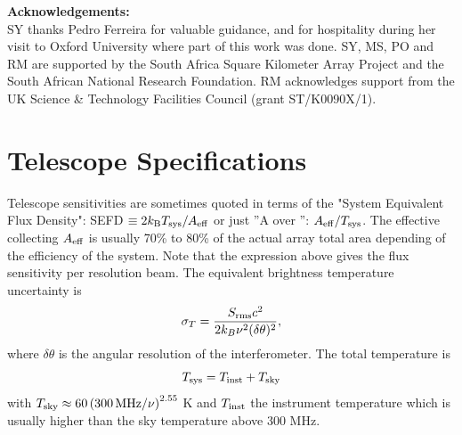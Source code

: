 \documentclass[useAMS,usenatbib]{mn2e}
\newcommand{\be}{\begin{equation}}
\newcommand{\ee}{\end{equation}}
\begin{document}
% 
%


\newpage
\[\]
{\bf Acknowledgements:}\\
SY thanks Pedro Ferreira for valuable guidance, and for hospitality during her visit to Oxford University where part of this work was done.
SY, MS, PO and
RM are supported by the South Africa Square Kilometer Array Project and  the South African National Research Foundation. RM acknowledges support from the UK Science \& Technology Facilities Council (grant ST/K0090X/1).
\newpage




\newpage

\appendix

\section{Telescope  Specifications}

Telescope sensitivities are sometimes quoted in terms of the "System Equivalent Flux Density": SEFD $\equiv 2 k_{\rm B} T_{\rm sys}/A_{\rm eff}$ or just ''A over '': $A_{\rm eff}/T_{\rm sys}$. The effective collecting $A_{\rm eff}$ is usually 70\% to 80\% of the actual array total area depending of the efficiency of the system. Note that the expression above gives the flux sensitivity per resolution beam. The equivalent brightness temperature uncertainty is
\be
\sigma_T= \frac{S_{\rm{rms}} c^2}{2 k_B \nu^2 (\delta\theta)^2},
\ee
where $\delta\theta$ is the angular resolution of the interferometer.
The total temperature is
\begin{equation}
T_{\rm sys}=T_{\rm inst}+T_{\rm sky}
\end{equation}
with $T_{\rm sky}\approx 60 \left(300\, {\rm MHz}/\nu \right)^{2.55}$ K and $T_{\rm inst}$ the instrument temperature which is usually higher than the sky temperature above 300 MHz.
\end{document}
